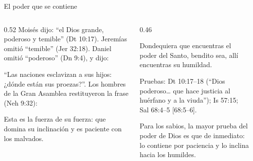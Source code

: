 \begin{frame}{El poder que se contiene}
\begin{columns}[t,onlytextwidth]
\begin{column}{0.52\textwidth}\scriptsize
Moisés dijo: ``el Dios grande, poderoso y temible'' (Dt 10:17). Jeremías omitió ``temible'' (Jer 32:18). Daniel omitió ``poderoso'' (Dn 9:4), y dijo:
\begin{center}\end{center}
``Las naciones esclavizan a sus hijos: ¿dónde están sus proezas?''. Los hombres de la Gran Asamblea restituyeron la frase (Neh 9:32):
\begin{cita}[colback=dorado!10!papiro,colframe=dorado!80!azul,fontupper=\scriptsize\itshape]Esta es la fuerza de su fuerza: que domina su inclinación y es paciente con los malvados.\end{cita}
\begin{center}\end{center}
\end{column}
\begin{column}{0.46\textwidth}\small
\begin{cita}[colback=dorado!10!papiro,colframe=dorado!80!azul,fontupper=\scriptsize\itshape]Dondequiera que encuentras el poder del Santo, bendito sea, allí encuentras su humildad.\end{cita}
\scriptsize Pruebas: Dt 10:17--18 (``Dios poderoso\ldots{} que hace justicia al huérfano y a la viuda''); Is 57:15; Sal 68:4--5 [68:5--6].\par\medskip
\small Para los sabios, la mayor prueba del poder de Dios es que  de inmediato: lo contiene por paciencia y lo inclina hacia los humildes.
\end{column}
\end{columns}
\end{frame}

